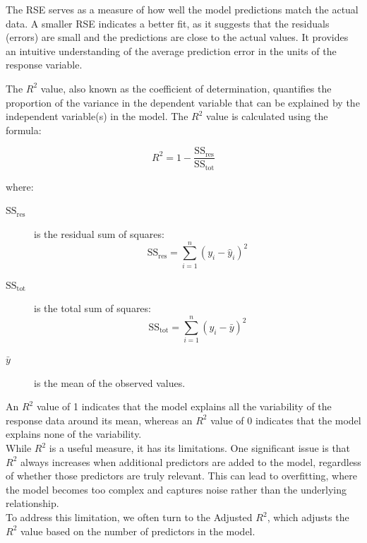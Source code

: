 The RSE serves as a measure of how well the model predictions match the actual data. A smaller RSE indicates a better fit, as it suggests that the residuals (errors) are small and the predictions are close to the actual values. It provides an intuitive understanding of the average prediction error in the units of the response variable.

\begin{definition}
    The \(R^2\) value, also known as the coefficient of determination, quantifies the proportion of the variance in the dependent variable that can be explained by the independent variable(s) in the model. The \(R^2\) value is calculated using the formula:
    
    \[
    R^2 = 1 - \frac{\text{SS}_{\text{res}}}{\text{SS}_{\text{tot}}}
    \]

    where:
    \begin{description}
        \item[\(\text{SS}_{\text{res}}\)] is the residual sum of squares:
        \[
        \text{SS}_{\text{res}} = \sum_{i=1}^{n} (y_i - \hat{y}_i)^2
        \]
        
        \item[\(\text{SS}_{\text{tot}}\)] is the total sum of squares:
        \[
        \text{SS}_{\text{tot}} = \sum_{i=1}^{n} (y_i - \bar{y})^2
        \]
        
        \item[\(\bar{y}\)] is the mean of the observed values.
    \end{description}
\end{definition}

An \(R^2\) value of 1 indicates that the model explains all the variability of the response data around its mean, whereas an \(R^2\) value of 0 indicates that the model explains none of the variability. \\

While \(R^2\) is a useful measure, it has its limitations. One significant issue is that \(R^2\) always increases when additional predictors are added to the model, regardless of whether those predictors are truly relevant. This can lead to overfitting, where the model becomes too complex and captures noise rather than the underlying relationship.\\

To address this limitation, we often turn to the Adjusted \(R^2\), which adjusts the \(R^2\) value based on the number of predictors in the model. 

